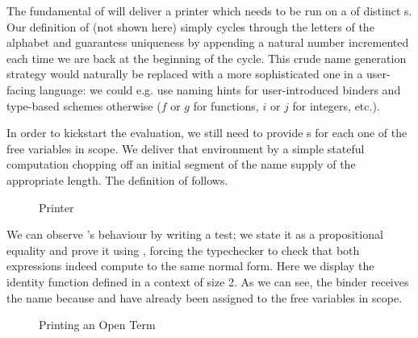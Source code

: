 

The fundamental  of  will deliver a printer which needs to be run
on a  of distinct s. Our definition of  (not
shown here) simply cycles through the letters of the alphabet and guarantess
uniqueness by appending a natural number incremented each time we are back at
the beginning of the cycle. This crude name generation strategy would naturally
be replaced with a more sophisticated one in a user-facing language: we could
e.g. use naming hints for user-introduced binders and type-based schemes otherwise
($f$ or $g$ for functions, $i$ or $j$ for integers, etc.).

In order to kickstart the evaluation, we still need to provide s
for each one of the free variables in scope. We deliver that environment
by a simple stateful computation  chopping off an initial segment
of the name supply of the appropriate length. The definition of 
follows.

\begin{figure}[h]
\caption{Printer\label{fig:printer}}
\end{figure}

We can observe 's behaviour by writing a test; we state it as a
propositional equality and prove it using , forcing the typechecker
to check that both expressions indeed compute to the same normal form. Here
we display the identity function defined in a context of size 2. As we can see,
the binder receives the name  because  and  have
already been assigned to the free variables in scope.

\begin{figure}[h]
\caption{Printing an Open Term\label{fig:printtest}}
\end{figure}
